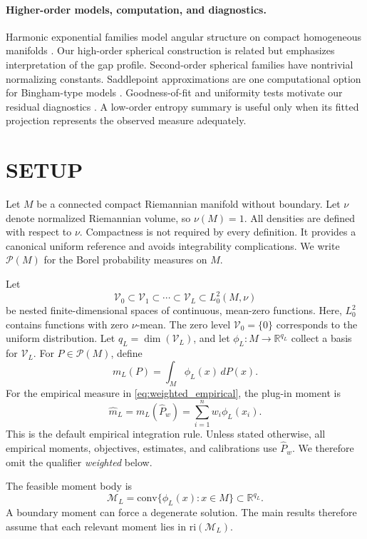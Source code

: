 \documentclass[twoside]{article}
\theoremstyle{definition}
\theoremstyle{remark}
\newcommand{\M}{\mathcal M}
\newcommand{\V}{\mathcal V}
\newcommand{\Pcal}{\mathcal P}
\newcommand{\R}{\mathbb R}
\newcommand{\ri}{\mathrm{ri}}
\newcommand{\conv}{\mathrm{conv}}
\begin{document}
\paragraph{Higher-order models, computation, and diagnostics.}
Harmonic exponential families model angular structure on compact homogeneous manifolds \citep{cohen_2015_HarmonicExponentialFamilies}. Our high-order spherical construction is related but emphasizes interpretation of the gap profile. Second-order spherical families have nontrivial normalizing constants. Saddlepoint approximations are one computational option for Bingham-type models \citep{kume_2005_SaddlepointApproximationsBingham}. Goodness-of-fit and uniformity tests motivate our residual diagnostics \citep{jupp_2008_DatadrivenSobolevTests,garcia-portugues_2018_OverviewUniformityTests}. A low-order entropy summary is useful only when its fitted projection represents the observed measure adequately.

\section{SETUP}


Let $M$ be a connected compact Riemannian manifold without boundary. Let $\nu$ denote normalized Riemannian volume, so $\nu(M)=1$. All densities are defined with respect to $\nu$. Compactness is not required by every definition. It provides a canonical uniform reference and avoids integrability complications. We write $\Pcal(M)$ for the Borel probability measures on $M$.

Let
\[
  \V_0 \subset \V_1 \subset \cdots \subset \V_L \subset L^2_0(M,\nu)
\]
be nested finite-dimensional spaces of continuous, mean-zero functions. Here, $L^2_0$ contains functions with zero $\nu$-mean. The zero level $\V_0=\{0\}$ corresponds to the uniform distribution. Let $q_L=\dim(\V_L)$, and let $\phi_L:M\to\R^{q_L}$ collect a basis for $\V_L$. For $P\in\Pcal(M)$, define
\[
  m_L(P)=\int_M \phi_L(x)\,dP(x).
\]
For the empirical measure in \eqref{eq:weighted_empirical}, the plug-in moment is
\[
  \widehat m_L=m_L(\widehat P_w)=\sum_{i=1}^n w_i\phi_L(x_i).
\]
This is the default empirical integration rule. Unless stated otherwise, all empirical moments, objectives, estimates, and calibrations use $\widehat P_w$. We therefore omit the qualifier \emph{weighted} below.

The feasible moment body is
\[
  \M_L=\conv\{\phi_L(x):x\in M\}\subset\R^{q_L}.
\]
A boundary moment can force a degenerate solution. The main results therefore assume that each relevant moment lies in $\ri(\M_L)$.
\end{document}
